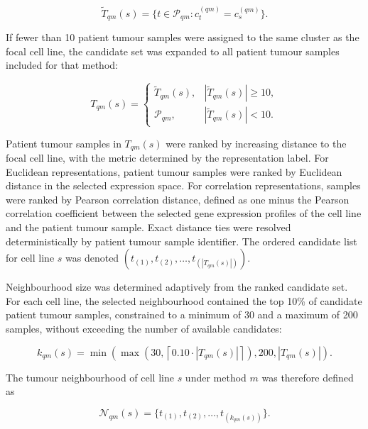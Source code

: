 \begin{equation}
\widetilde{T}_{qm}(s) =
\{ t \in \mathcal{P}_{qm} : c_t^{(qm)} = c_s^{(qm)} \}.
\end{equation}

If fewer than 10 patient tumour samples were assigned to the same
cluster as the focal cell line, the candidate set was expanded to all
patient tumour samples included for that method:

\begin{equation}
T_{qm}(s) =
\begin{cases}
\widetilde{T}_{qm}(s), & |\widetilde{T}_{qm}(s)| \geq 10, \\
\mathcal{P}_{qm}, & |\widetilde{T}_{qm}(s)| < 10 .
\end{cases}
\end{equation}

Patient tumour samples in \(T_{qm}(s)\) were ranked by increasing
distance to the focal cell line, with the metric determined by the
representation label. For Euclidean representations, patient tumour samples
were ranked by Euclidean distance in the selected expression space. For
correlation representations, samples were ranked by Pearson correlation
distance, defined as one minus the Pearson correlation coefficient
between the selected gene expression profiles of the cell line and the
patient tumour sample. Exact distance ties were resolved deterministically by patient tumour sample identifier. The ordered candidate list for cell line \(s\)
was denoted
\((t_{(1)}, t_{(2)}, \ldots, t_{(|T_{qm}(s)|)})\).

Neighbourhood size was determined adaptively from the ranked candidate
set. For each cell line, the selected neighbourhood contained the top
10\% of candidate patient tumour samples, constrained to a minimum
of 30 and a maximum of 200 samples, without exceeding the number of
available candidates:

\begin{equation}
k_{qm}(s) =
\min\!\left(
\max\!\left(30,
\left\lceil 0.10 \cdot |T_{qm}(s)| \right\rceil
\right),
200,
|T_{qm}(s)|
\right).
\end{equation}

The tumour neighbourhood of cell line \(s\) under method \(m\) was
therefore defined as

\begin{equation}
\mathcal{N}_{qm}(s) =
\{ t_{(1)}, t_{(2)}, \ldots, t_{(k_{qm}(s))} \}.
\end{equation}


